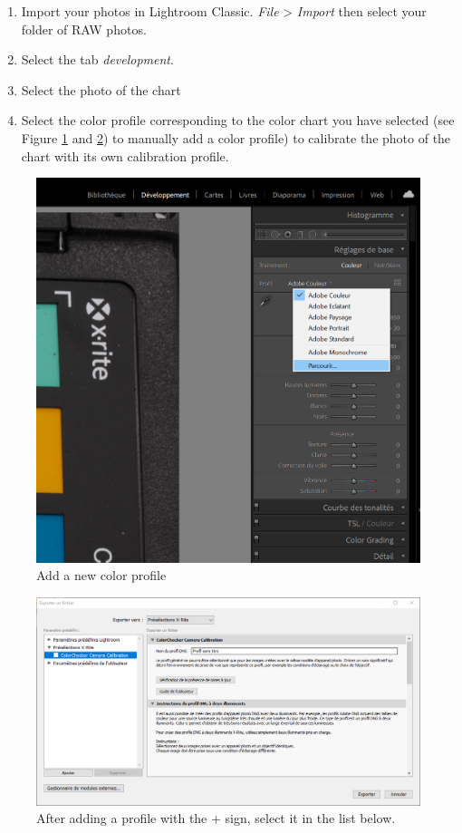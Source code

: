 \documentclass[
]{book}
\begin{document}
\begin{enumerate}
\def\labelenumi{\arabic{enumi}.}
\item
  Import your photos in Lightroom Classic. \emph{File} \textgreater{} \emph{Import} then
  select your folder of RAW photos.
\item
  Select the tab \emph{development}.
\item
  Select the photo of the chart
\item
  Select the color profile corresponding to the color chart you have selected (see Figure \ref{fig:addprofile} and \ref{fig:settingssynchronize}) to manually add a color profile) to calibrate the photo of the chart with its own calibration profile.
\end{enumerate}

\begin{figure}

{\centering \includegraphics[width=0.8\linewidth]{Figures/profil_capture_1} 

}

\caption{Add a new color profile}\label{fig:addprofile}
\end{figure}

\begin{figure}

{\centering \includegraphics[width=0.8\linewidth]{Figures/x_rite_preselection} 

}

\caption{After adding a profile with the + sign, select it in the list below.}\label{fig:settingssynchronize}
\end{figure}
\end{document}
